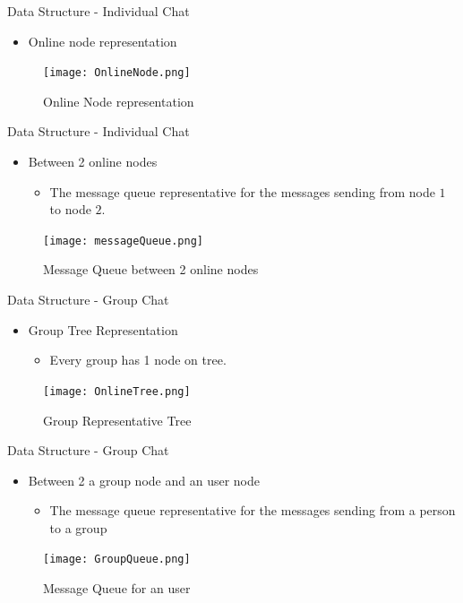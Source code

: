\documentclass{beamer}
\begin{document}
\begin{frame}{Data Structure - Individual Chat}
	\begin{itemize}
		\item Online node representation
	\end{itemize}
	
	\begin{figure}
		\texttt{[image: OnlineNode.png]}
		\caption{Online Node representation}
	\end{figure}
\end{frame}

\begin{frame}{Data Structure - Individual Chat}
	\begin{itemize}
		\item Between 2 online nodes
		\begin{itemize}
			\item The message queue representative for the messages sending from node $1$ to node $2$.
		\end{itemize}
	\end{itemize}
	
	\begin{figure}
		\texttt{[image: messageQueue.png]}
		\caption{Message Queue between 2 online nodes}
	\end{figure}
\end{frame}

\begin{frame}{Data Structure - Group Chat}
\begin{itemize}
	\item Group Tree Representation
	\begin{itemize}
		\item Every group has 1 node on tree.
	\end{itemize}
\end{itemize}

\begin{figure}
	\texttt{[image: OnlineTree.png]}
	\caption{Group Representative Tree}
\end{figure}
\end{frame}

\begin{frame}{Data Structure - Group Chat}
\begin{itemize}
	\item Between 2 a group node and an user node
	\begin{itemize}
		\item The message queue representative for the messages sending from a person to a group
	\end{itemize}
\end{itemize}

\begin{figure}
	\texttt{[image: GroupQueue.png]}
	\caption{Message Queue for an user}
\end{figure}
\end{frame}
\end{document}
